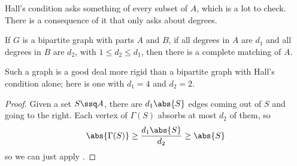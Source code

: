 Hall's condition asks something of every subset of $A$, which is a lot to check. There is a consequence of it that only asks about degrees.

\begin{boxtheorem} \label{Ch2:Cor:Biregular}
    If $G$ is a bipartite graph with parts $A$ and $B$, if all degrees in $A$ are $d_1$ and all degrees in $B$ are $d_2$, with $1 \leq d_2 \leq d_1$, then there is a complete matching of $A$.
\end{boxtheorem}

Such a graph is a good deal more rigid than a bipartite graph with Hall's condition alone; here is one with $d_1 = 4$ and $d_2 = 2$.

\begin{figure}[H]
    \centering
\end{figure}

\begin{proof}
    Given a set $S \ssq A$, there are $d_1 \abs{S}$ edges coming out of $S$ and going to the right. Each vertex of $\Gamma(S)$ absorbs at most $d_2$ of them, so
    \begin{align*}
        \abs{\Gamma(S)} \geq \frac{d_1\abs{S}}{d_2} \geq \abs{S}
    \end{align*}
    so we can just apply .
\end{proof}

